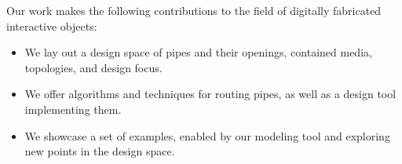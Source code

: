 Our work makes the following contributions to the field of digitally fabricated interactive objects:

\begin{itemize}
\item We lay out a design space of pipes and their openings, contained media, topologies, and design focus.
\item We offer algorithms and techniques for routing pipes, as well as a design tool implementing them.
\item We showcase a set of examples, enabled by our modeling tool and exploring new points in the design space.
\end{itemize}